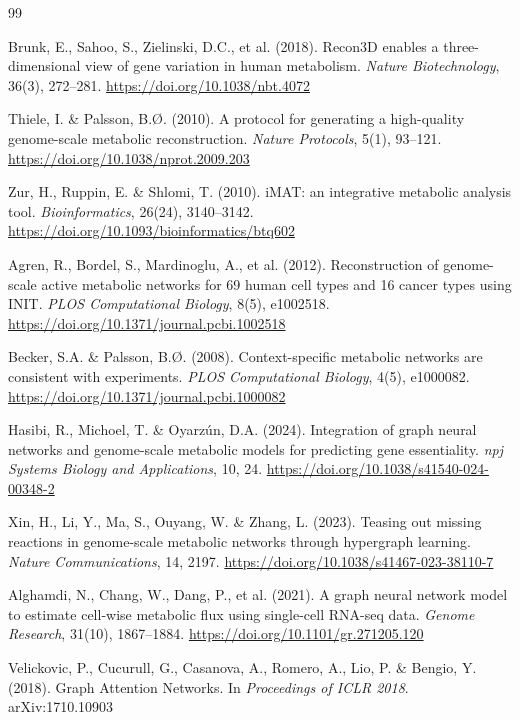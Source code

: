 \documentclass[12pt,a4paper]{article}
\begin{document}
\begin{thebibliography}{99}

 Brunk, E., Sahoo, S., Zielinski, D.C., et al. (2018). Recon3D enables a three-dimensional view of gene variation in human metabolism. \textit{Nature Biotechnology}, 36(3), 272--281. \url{https://doi.org/10.1038/nbt.4072}

 Thiele, I. \& Palsson, B.\O. (2010). A protocol for generating a high-quality genome-scale metabolic reconstruction. \textit{Nature Protocols}, 5(1), 93--121. \url{https://doi.org/10.1038/nprot.2009.203}

 Zur, H., Ruppin, E. \& Shlomi, T. (2010). iMAT: an integrative metabolic analysis tool. \textit{Bioinformatics}, 26(24), 3140--3142. \url{https://doi.org/10.1093/bioinformatics/btq602}

 Agren, R., Bordel, S., Mardinoglu, A., et al. (2012). Reconstruction of genome-scale active metabolic networks for 69 human cell types and 16 cancer types using INIT. \textit{PLOS Computational Biology}, 8(5), e1002518. \url{https://doi.org/10.1371/journal.pcbi.1002518}

 Becker, S.A. \& Palsson, B.\O. (2008). Context-specific metabolic networks are consistent with experiments. \textit{PLOS Computational Biology}, 4(5), e1000082. \url{https://doi.org/10.1371/journal.pcbi.1000082}

 Hasibi, R., Michoel, T. \& Oyarz\'{u}n, D.A. (2024). Integration of graph neural networks and genome-scale metabolic models for predicting gene essentiality. \textit{npj Systems Biology and Applications}, 10, 24. \url{https://doi.org/10.1038/s41540-024-00348-2}

 Xin, H., Li, Y., Ma, S., Ouyang, W. \& Zhang, L. (2023). Teasing out missing reactions in genome-scale metabolic networks through hypergraph learning. \textit{Nature Communications}, 14, 2197. \url{https://doi.org/10.1038/s41467-023-38110-7}

 Alghamdi, N., Chang, W., Dang, P., et al. (2021). A graph neural network model to estimate cell-wise metabolic flux using single-cell RNA-seq data. \textit{Genome Research}, 31(10), 1867--1884. \url{https://doi.org/10.1101/gr.271205.120}

 Velickovic, P., Cucurull, G., Casanova, A., Romero, A., Lio, P. \& Bengio, Y. (2018). Graph Attention Networks. In \textit{Proceedings of ICLR 2018}. arXiv:1710.10903


\end{thebibliography}
\end{document}
